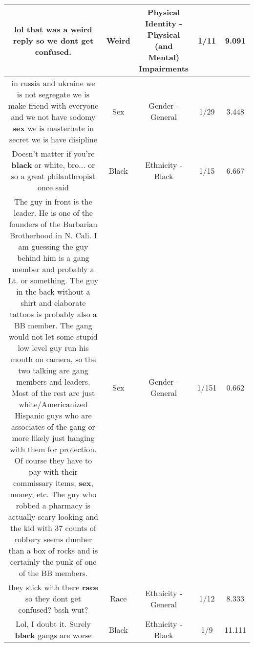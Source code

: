 \documentclass[11pt]{article}
\newlength\mylength
\begin{document}
\begin{center}
\begin{longtable}{|C{.65\mylength}|C{.30\mylength}|C{.12\mylength}|C{.12\mylength}|C{.12\mylength}|}
  \small lol that was a \textbf{weird} reply so we dont get confused.\normalsize   & Weird & Physical Identity - Physical (and Mental) Impairments & 1/11 & 9.091 \\  \hline
  \small in russia and ukraine we is not segregate we is make friend with everyone and we not have sodomy \textbf{sex} we is masterbate in secret we is have disipline\normalsize   & Sex & Gender - General & 1/29 & 3.448 \\  \hline
  \small Doesn't matter if you're \textbf{black} or white, bro... or so a great philanthropist once said\normalsize   & Black & Ethnicity - Black & 1/15 & 6.667 \\  \hline
  \small The guy in front is the leader.  He is one of the founders of the Barbarian Brotherhood in N. Cali.  I am guessing the guy behind him is a gang member and probably a Lt. or something.  The guy in the back without a shirt and elaborate tattoos is probably also a BB member.  The gang would not let some stupid low level guy run his mouth on camera, so the two talking are gang members and leaders.  Most of the rest are just white/Americanized Hispanic guys who are associates of the gang or more likely just hanging with them for protection.  Of course they have to pay with their commissary items, \textbf{sex}, money, etc.  The guy who robbed a pharmacy is actually scary looking and the kid with 37 counts of robbery seems dumber than a box of rocks and is certainly the punk of one of the BB members.\normalsize   & Sex & Gender - General & 1/151 & 0.662 \\  \hline
  \small they stick with there \textbf{race} so they dont get confused? bssh wut?\normalsize   & Race & Ethnicity - General & 1/12 & 8.333 \\  \hline
  \small Lol, I doubt it. Surely \textbf{black} gangs are worse\normalsize   & Black & Ethnicity - Black & 1/9 & 11.111 \\  \hline

\end{longtable}
\end{center}
\end{document}
